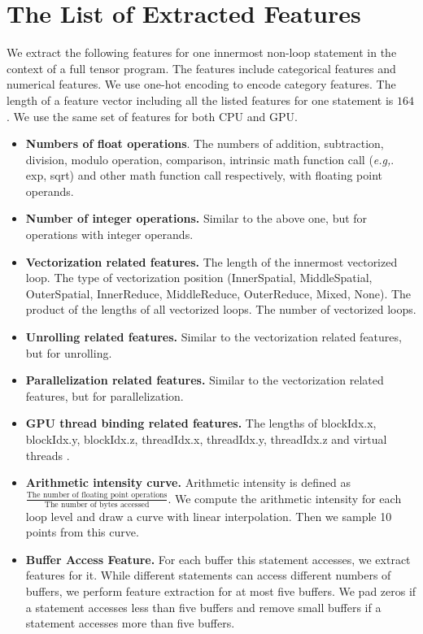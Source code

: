\section{The List of Extracted Features}
\label{sec:extracted-features}
We extract the following features for one innermost non-loop statement in the context of a full tensor program. The features include categorical features and numerical features. We use one-hot encoding to encode category features. The length of a feature vector including all the listed features for one statement is $164$. We use the same set of features for both CPU and GPU.

\begin{itemize}
    \itemsep-0.2em
    \item \textbf{Numbers of float operations}. The numbers of addition, subtraction, division, modulo operation, comparison, intrinsic math function call (\textit{e.g,}. exp, sqrt) and other math function call respectively, with floating point operands.
    \item \textbf{Number of integer operations.} Similar to the above one, but for operations with integer operands.
    \item \textbf{Vectorization related features.} The length of the innermost vectorized loop. The type of vectorization position (InnerSpatial, MiddleSpatial, OuterSpatial, InnerReduce, MiddleReduce, OuterReduce, Mixed, None). The product of the lengths of all vectorized loops. The number of vectorized loops.
    \item \textbf{Unrolling related features.} Similar to the vectorization related features, but for unrolling.
    \item \textbf{Parallelization related features.} Similar to the vectorization related features, but for parallelization.
    \item \textbf{GPU thread binding related features.} The lengths of blockIdx.x, blockIdx.y, blockIdx.z, threadIdx.x, threadIdx.y, threadIdx.z and virtual threads \cite{chen2018tvm}.
    \item \textbf{Arithmetic intensity curve.} Arithmetic intensity is defined as  $\frac{\text{The number of floating point operations}}{\text{The number of bytes accessed}}$. We compute the arithmetic intensity for each loop level and draw a curve with linear interpolation. Then we sample 10 points from this curve.
    \item \textbf{Buffer Access Feature.}
    For each buffer this statement accesses, we extract features for it. While different statements can access different numbers of buffers, we perform feature extraction for at most five buffers. We pad zeros if a statement accesses less than five buffers and remove small buffers if a statement accesses more than five buffers.

\end{itemize}
